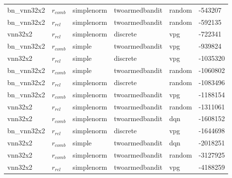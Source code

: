 \begin{table}[]
{\begin{tabular}{l|l|l|l|l|l}
            bn\_vnn32x2      &       $r_{comb}$       &       simplenorm             &   twoarmedbandit     & random               & -543207    \\
            bn\_vnn32x2      &       $r_{rel}$        &       simplenorm             &   twoarmedbandit     & random               & -592135    \\
            vnn32x2          &       $r_{rel}$        &       simplenorm             &   discrete           & vpg                  & -722341    \\
            bn\_vnn32x2      &       $r_{comb}$       &       simple                 &   twoarmedbandit     & vpg                  & -939824    \\
            vnn32x2          &       $r_{rel}$        &       simple                 &   discrete           & vpg                  & -1035320   \\
            bn\_vnn32x2      &       $r_{comb}$       &       simple                 &   twoarmedbandit     & random               & -1060802   \\
            bn\_vnn32x2      &       $r_{rel}$        &       simplenorm             &   discrete           & random               & -1083496   \\
            bn\_vnn32x2      &       $r_{comb}$       &       simplenorm             &   twoarmedbandit     & vpg                  & -1188154   \\
            vnn32x2          &       $r_{rel}$        &       simplenorm             &   twoarmedbandit     & random               & -1311061   \\
            vnn32x2          &       $r_{comb}$       &       simplenorm             &   twoarmedbandit     & dqn                  & -1608152   \\
            bn\_vnn32x2      &       $r_{rel}$        &       simplenorm             &   discrete           & vpg                  & -1644698   \\
            vnn32x2          &       $r_{comb}$       &       simple                 &   twoarmedbandit     & dqn                  & -2018251   \\
            vnn32x2          &       $r_{comb}$       &       simplenorm             &   twoarmedbandit     & random               & -3127925   \\
            vnn32x2          &       $r_{rel}$        &       simplenorm             &   twoarmedbandit     & vpg                  & -4188259   \\

\end{tabular}}
\end{table}
